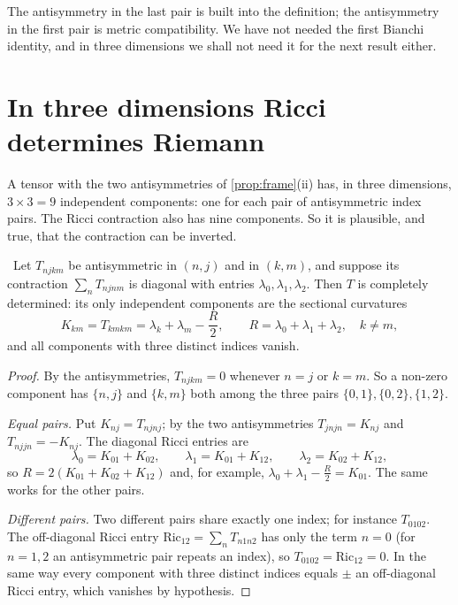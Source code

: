 The antisymmetry in the last pair is built into the definition; the antisymmetry in the first pair is metric compatibility. We have not needed the first Bianchi identity, and in three dimensions we shall not need it for the next result either.

\section{In three dimensions Ricci determines Riemann}

A tensor with the two antisymmetries of \cref{prop:frame}(ii) has, in three dimensions, $3\times3=9$ independent components: one for each pair of antisymmetric index pairs. The Ricci contraction also has nine components. So it is plausible, and true, that the contraction can be inverted.

\begin{theorem}\label{thm:riemricci}\ver\
Let $T_{njkm}$ be antisymmetric in $(n,j)$ and in $(k,m)$, and suppose its contraction $\sum_nT_{njnm}$ is diagonal with entries $\lambda_0,\lambda_1,\lambda_2$. Then $T$ is completely determined: its only independent components are the sectional curvatures
\[
K_{km}=T_{kmkm}=\lambda_k+\lambda_m-\frac{R}{2},\qquad R=\lambda_0+\lambda_1+\lambda_2,\quad k\ne m,
\]
and all components with three distinct indices vanish.
\end{theorem}
\begin{proof}
By the antisymmetries, $T_{njkm}=0$ whenever $n=j$ or $k=m$. So a non-zero component has $\{n,j\}$ and $\{k,m\}$ both among the three pairs $\{0,1\},\{0,2\},\{1,2\}$.

\emph{Equal pairs.} Put $K_{nj}=T_{njnj}$; by the two antisymmetries $T_{jnjn}=K_{nj}$ and $T_{njjn}=-K_{nj}$. The diagonal Ricci entries are
\[
\lambda_0=K_{01}+K_{02},\qquad \lambda_1=K_{01}+K_{12},\qquad \lambda_2=K_{02}+K_{12},
\]
so $R=2(K_{01}+K_{02}+K_{12})$ and, for example, $\lambda_0+\lambda_1-\frac R2=K_{01}$. The same works for the other pairs.

\emph{Different pairs.} Two different pairs share exactly one index; for instance $T_{0102}$. The off-diagonal Ricci entry $\mathrm{Ric}_{12}=\sum_nT_{n1n2}$ has only the term $n=0$ (for $n=1,2$ an antisymmetric pair repeats an index), so $T_{0102}=\mathrm{Ric}_{12}=0$. In the same way every component with three distinct indices equals $\pm$ an off-diagonal Ricci entry, which vanishes by hypothesis.
\end{proof}


